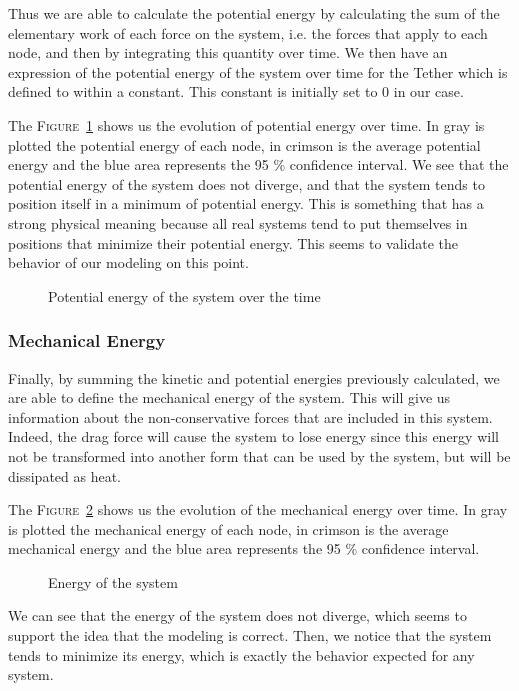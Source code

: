 Thus we are able to calculate the potential energy by calculating the sum of the elementary work of each force on the system, i.e. the forces that apply to each node, and then by integrating this quantity over time. We then have an expression of the potential energy of the system over time for the Tether which is defined to within a constant. This constant is initially set to $0$ in our case.

The \textsc{Figure}~\ref{fig:potential_energy} shows us the evolution of potential energy over time. In gray is plotted the potential energy of each node, in crimson is the average potential energy and the blue area represents the 95 \% confidence interval. We see that the potential energy of the system does not diverge, and that the system tends to position itself in a minimum of potential energy. This is something that has a strong physical meaning because all real systems tend to put themselves in positions that minimize their potential energy. This seems to validate the behavior of our modeling on this point.

\begin{figure}
    \centering
    
    \caption{Potential energy of the system over the time}
    \label{fig:potential_energy}
\end{figure}

\subsubsection{Mechanical Energy}

Finally, by summing the kinetic and potential energies previously calculated, we are able to define the mechanical energy of the system. This will give us information about the non-conservative forces that are included in this system. Indeed, the drag force will cause the system to lose energy since this energy will not be transformed into another form that can be used by the system, but will be dissipated as heat.

The \textsc{Figure}~\ref{fig:energy} shows us the evolution of the mechanical energy over time. In gray is plotted the mechanical energy of each node, in crimson is the average mechanical energy and the blue area represents the 95 \% confidence interval.

\begin{figure}
    \centering
    
    \caption{Energy of the system}
    \label{fig:energy}
\end{figure}

We can see that the energy of the system does not diverge, which seems to support the idea that the modeling is correct. Then, we notice that the system tends to minimize its energy, which is exactly the behavior expected for any system.